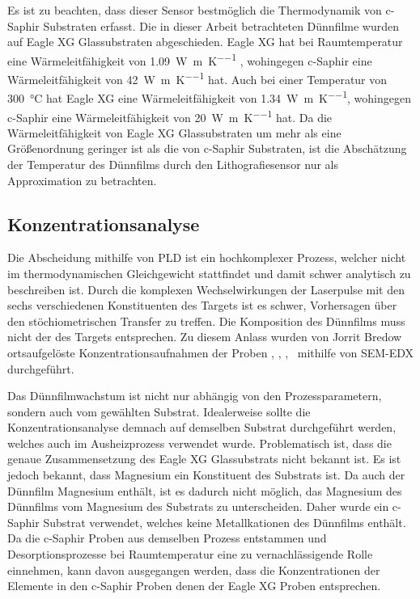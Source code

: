 Es ist zu beachten, dass dieser Sensor bestmöglich die Thermodynamik von c-Saphir Substraten erfasst.
Die in dieser Arbeit betrachteten Dünnfilme wurden auf Eagle XG Glassubstraten abgeschieden.
Eagle XG hat bei Raumtemperatur eine Wärmeleitfähigkeit von \qty{1.09}{\watt\per\meter\per\kelvin} \autocite{eaglexg},
wohingegen c-Saphir eine Wärmeleitfähigkeit von \qty{42}{\watt\per\meter\per\kelvin} \autocite{saphir} hat.
Auch bei einer Temperatur von \qty{300}{\degreeCelsius} hat Eagle XG eine Wärmeleitfähigkeit von
\qty{1.34}{\watt\per\meter\per\kelvin}, wohingegen c-Saphir eine Wärmeleitfähigkeit von
\qty{20}{\watt\per\meter\per\kelvin} hat.
Da die Wärmeleitfähigkeit von Eagle XG Glassubstraten um mehr als eine Größenordnung geringer ist als die von
c-Saphir Substraten, ist die Abschätzung der Temperatur des Dünnfilms durch den Lithografiesensor nur als
Approximation zu betrachten.

\subsection{Konzentrationsanalyse}\label{subsec:edx-analyse}
Die Abscheidung mithilfe von PLD ist ein hochkomplexer Prozess, welcher nicht im thermodynamischen Gleichgewicht
stattfindet und damit schwer analytisch zu beschreiben ist.
Durch die komplexen Wechselwirkungen der Laserpulse mit den sechs verschiedenen Konstituenten des Targets
ist es schwer, Vorhersagen über den stöchiometrischen Transfer zu treffen.
Die Komposition des Dünnfilms muss nicht der des Targets entsprechen.
Zu diesem Anlass wurden von Jorrit Bredow ortsaufgelöste Konzentrationsaufnahmen der Proben \csamplethree, \csampleone,
\csampletwo, \csamplefour\ mithilfe von SEM-EDX durchgeführt.

Das Dünnfilmwachstum ist nicht nur abhängig von den Prozessparametern, sondern auch vom gewählten Substrat.
Idealerweise sollte die Konzentrationsanalyse demnach auf demselben Substrat durchgeführt werden, welches auch im
Ausheizprozess verwendet wurde.
Problematisch ist, dass die genaue Zusammensetzung des Eagle XG Glassubstrats nicht bekannt ist.
Es ist jedoch bekannt, dass Magnesium ein Konstituent des Substrats ist.
Da auch der Dünnfilm Magnesium enthält, ist es dadurch nicht möglich, das Magnesium des Dünnfilms vom Magnesium des
Substrats zu unterscheiden.
Daher wurde ein c-Saphir Substrat verwendet, welches keine Metallkationen des Dünnfilms enthält.
Da die c-Saphir Proben aus demselben Prozess entstammen und Desorptionsprozesse bei Raumtemperatur eine zu
vernachlässigende Rolle einnehmen, kann davon ausgegangen werden, dass die Konzentrationen der Elemente in den
c-Saphir Proben denen der Eagle XG Proben entsprechen.


